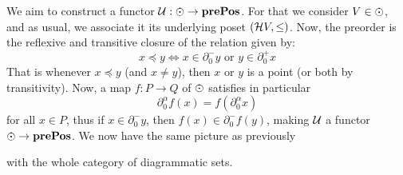We aim to construct a functor \( \U : \eye \to \prePos \). For that we consider \( V \in \eye \), and as usual, we associate it its underlying poset \( (\mathcal{H} V, \le) \). Now, the preorder is the reflexive and transitive closure of the relation given by:
\begin{equation*}
    x \preceq y \iff x \in \partial^-_0 y \text{ or } y \in \partial^+_0 x
\end{equation*}
That is whenever \( x \preceq y \) (and \( x \neq y \)), then \( x \) or \( y \) is a point (or both by transitivity). Now, a map \( f : P \to Q \) of \( \eye \) satisfies in particular 
\begin{equation*}
    \partial^\alpha_0f(x) = f(\partial^\alpha_0 x) 
\end{equation*}
for all \( x \in P \), thus if \(  x \in \partial^-_0 y \), then \(  f(x) \in \partial^-_0 f(y) \), making \( \mathcal{U} \) a functor \( \eye \to \prePos \). We now have the same picture as previously
\begin{center}
\end{center}
with the whole category of diagrammatic sets.
